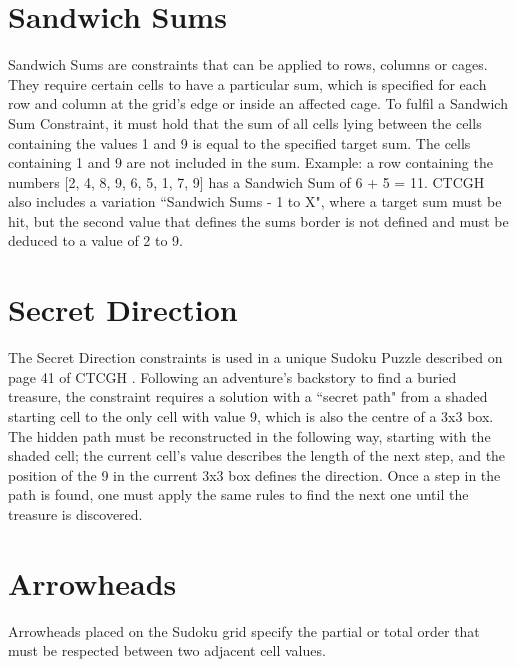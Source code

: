 \section{Sandwich Sums}
Sandwich Sums are constraints that can be applied to rows, columns or cages. They require certain cells to have a particular sum, which is specified for each row and column at the grid's edge or inside an affected cage. To fulfil a Sandwich Sum Constraint, it must hold that the sum of all cells lying between the cells containing the values 1 and 9 is equal to the specified target sum. The cells containing 1 and 9 are not included in the sum. Example: a row containing the numbers [2, 4, 8, 9, 6, 5, 1, 7, 9] has a Sandwich Sum of 6 + 5 = 11. CTCGH \cite{CrackingTheCryptic2021} also includes a variation ``Sandwich Sums - 1 to X", where a target sum must be hit, but the second value that defines the sums border is not defined and must be deduced to a value of 2 to 9.

\section{Secret Direction}
The Secret Direction constraints is used in a unique Sudoku Puzzle described on page 41 of CTCGH \cite{CrackingTheCryptic2021}. Following an adventure's backstory to find a buried treasure, the constraint requires a solution with a ``secret path" from a shaded starting cell to the only cell with value 9, which is also the centre of a 3x3 box. The hidden path must be reconstructed in the following way, starting with the shaded cell; the current cell's value describes the length of the next step, and the position of the 9 in the current 3x3 box defines the direction. Once a step in the path is found, one must apply the same rules to find the next one until the treasure is discovered.

\section{Arrowheads}
Arrowheads placed on the Sudoku grid specify the partial or total order that must be respected between two adjacent cell values.

